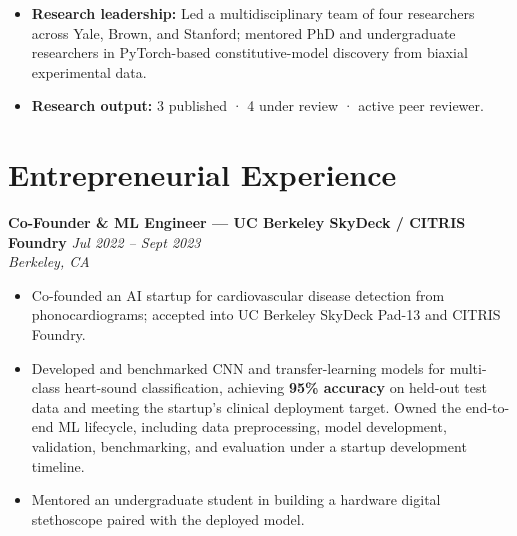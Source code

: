 \documentclass[10pt, letterpaper]{article}
\newcommand{\jobheader}[2]{%
  \noindent
  \textbf{\color{darkgray}#1}
  \hfill
  {\color{midgray}\textit{#2}}
  \\[-2pt]
}
\newcommand{\subline}[1]{%
  \noindent
  {\color{midgray}\textit{#1}}
  \par\vspace{2pt}
}
\begin{document}
\begin{itemize}

\item \textbf{Research leadership:}
Led a multidisciplinary team of four researchers across Yale, Brown, and
Stanford; mentored PhD and undergraduate researchers in PyTorch-based
constitutive-model discovery from biaxial experimental data.

\item \textbf{Research output:}
3 published · 4 under review · active peer reviewer.

\end{itemize}



\section{Entrepreneurial Experience}

\jobheader
{Co-Founder \& ML Engineer --- UC Berkeley SkyDeck / CITRIS Foundry}
{Jul 2022 -- Sept 2023}

\subline{Berkeley, CA}

\begin{itemize}

\item Co-founded an AI startup for cardiovascular disease detection from
phonocardiograms; accepted into UC Berkeley SkyDeck Pad-13 and CITRIS Foundry.

\item Developed and benchmarked CNN and transfer-learning models for
multi-class heart-sound classification, achieving \textbf{95\% accuracy}
on held-out test data and meeting the startup's clinical deployment target.
Owned the end-to-end ML lifecycle, including data preprocessing,
model development, validation, benchmarking, and evaluation under a
startup development timeline.

\item Mentored an undergraduate student in building a hardware digital
stethoscope paired with the deployed model.

\end{itemize}


\end{document}
